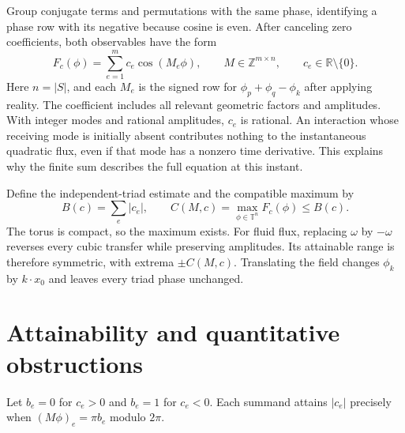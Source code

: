 \documentclass[11pt]{article}
\newcommand{\T}{\mathbb T}\newcommand{\Z}{\mathbb Z}\newcommand{\R}{\mathbb R}
\begin{document}
Group conjugate terms and permutations with the same phase, identifying a phase row with its negative because cosine is even. After canceling zero coefficients, both observables have the form
\begin{equation}\label{eq:polynomial}
 F_c(\phi)=\sum_{e=1}^m c_e\cos(M_e\phi),\qquad M\in\Z^{m\times n},\qquad c_e\in\R\setminus\{0\}.
\end{equation}
Here $n=|S|$, and each $M_e$ is the signed row for $\phi_p+\phi_q-\phi_k$ after applying reality. The coefficient includes all relevant geometric factors and amplitudes. With integer modes and rational amplitudes, $c_e$ is rational. An interaction whose receiving mode is initially absent contributes nothing to the instantaneous quadratic flux, even if that mode has a nonzero time derivative. This explains why the finite sum describes the full equation at this instant.

Define the independent-triad estimate and the compatible maximum by
\begin{equation}
 B(c)=\sum_e|c_e|,\qquad C(M,c)=\max_{\phi\in\T^n}F_c(\phi)\le B(c).
\end{equation}
The torus is compact, so the maximum exists. For fluid flux, replacing $\omega$ by $-\omega$ reverses every cubic transfer while preserving amplitudes. Its attainable range is therefore symmetric, with extrema $\pm C(M,c)$. Translating the field changes $\phi_k$ by $k\cdot x_0$ and leaves every triad phase unchanged.

\section{Attainability and quantitative obstructions}\label{sec:criterion}
Let $b_e=0$ for $c_e>0$ and $b_e=1$ for $c_e<0$. Each summand attains $|c_e|$ precisely when $(M\phi)_e=\pi b_e$ modulo $2\pi$.
\end{document}
